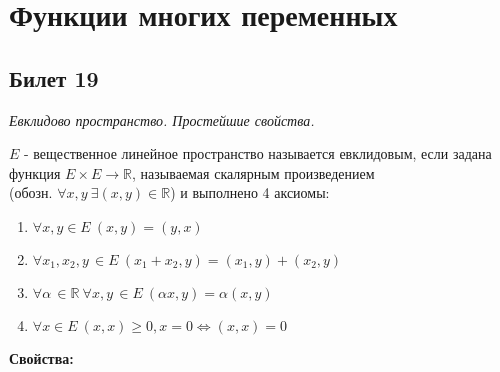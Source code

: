\section{Функции многих переменных}
\subsection{Билет 19}


\textit{Евклидово пространство. Простейшие свойства.}


 $E$ - вещественное линейное пространство называется евклидовым, если задана функция $E \times E \to \mathbb{R}$, называемая скалярным произведением \\ 
(обозн. $\forall x, y\ \exists (x, y) \in \mathbb{R}$) и выполнено 4 аксиомы:
  \begin{enumerate}
    \item $\forall x, y \in E\ (x, y) = (y, x)$
    \item $\forall x_1, x_2, y\,\in E\ (x_1 + x_2, y) = (x_1, y) + (x_2, y) $
    \item $\forall \alpha\,\in \mathbb{R}\ \forall x, y\,\in E\ (\alpha x, y) = \alpha(x, y)$
    \item $\forall x \in E\ (x, x) \ge 0, x = 0 \Leftrightarrow (x, x) = 0$
  \end{enumerate}
  
  \begin{center}
   \textbf{Свойства:}
  \end{center}
  
